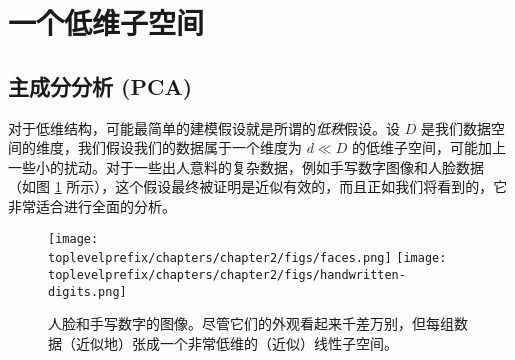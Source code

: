 \documentclass[../../book-main_zh.tex]{subfiles}
\begin{document}








\section{一个低维子空间} \label{sec:lowrank}

\subsection{主成分分析 (PCA)}\label{sub:pca}

对于低维结构，可能最简单的建模假设就是所谓的\textit{低秩}假设。设 \(D\) 是我们数据空间的维度，我们假设我们的数据属于一个维度为 \(d \ll D\) 的低维子空间，可能加上一些小的扰动。对于一些出人意料的复杂数据，例如手写数字图像和人脸数据 \cite{BasriR2003-PAMI}（如图 \ref{fig:faces-digits} 所示），这个假设最终被证明是近似有效的，而且正如我们将看到的，它非常适合进行全面的分析。

\begin{figure}
    \centering
    \texttt{[image: \\toplevelprefix/chapters/chapter2/figs/faces.png]}
    \hspace{5mm} \texttt{[image: \\toplevelprefix/chapters/chapter2/figs/handwritten-digits.png]}   
    \caption{人脸和手写数字的图像。尽管它们的外观看起来千差万别，但每组数据（近似地）张成一个非常低维的（近似）线性子空间。}
    \label{fig:faces-digits}
\end{figure}
\end{document}
